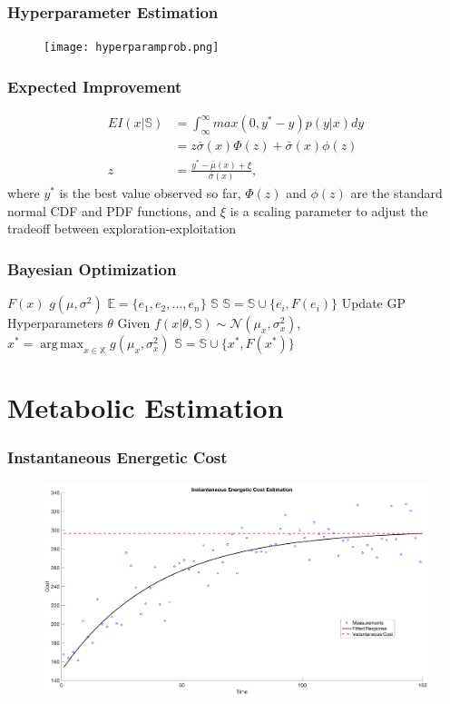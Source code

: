 \documentclass[compress, xcolor=pst]{beamer}
\DeclareMathOperator*{\argmax}{arg\,max}
\begin{document}
\begin{frame}
	\frametitle{\textbf{Hyperparameter Estimation}}
	\begin{figure}
	\centering
	\texttt{[image: hyperparamprob.png]}
	\end{figure}
\end{frame}

\begin{frame}
	\frametitle{\textbf{Expected Improvement}}
	\begin{align*}
	  EI(x\vert \mathbb{S}) &= \int_\infty^\infty max(0, y^*-y)p(y\vert x)dy\\
	    &= z\bar{\sigma}(x)\Phi(z) + \bar{\sigma}(x)\phi(z)\\
	  z &= \frac{y^* - \bar{\mu}(x) + \xi}{\bar{\sigma}(x)},
	\end{align*}
	where $y^*$ is the best value observed so far, $\Phi(z)$ and $\phi(z)$ are the standard normal CDF and PDF functions, and $\xi$ is a scaling parameter to adjust the tradeoff between exploration-exploitation
\end{frame}

\begin{frame}
	\frametitle{\textbf{Bayesian Optimization}}
	\begin{algorithmic}
	\State {} $F(x)$
	\State {} $g(\mu, \sigma^2)$
	\State {} $\mathbb{E} = \{e_1, e_2, ..., e_n\}$
	\State {} $\mathbb{S}$
	  \State $\mathbb{S} = \mathbb{S} \cup \{e_i, F(e_i)\}$
	\End
	  \State Update GP Hyperparameters $\theta$
	  \State Given $f(x\vert \theta, \mathbb{S}) \sim \mathcal{N}(\mu_x, \sigma_x^2)$,
	  \State $x^* = \argmax_{x \in \mathbb{X}} g(\mu_x, \sigma_x^2)$
	  \State $\mathbb{S} = \mathbb{S} \cup \{x^*, F(x^*)\}$
	\End
	\end{algorithmic}
\end{frame}

\section{Metabolic Estimation}
\begin{frame}
	\frametitle{\textbf{Instantaneous Energetic Cost}}
	\begin{figure}
	\centering
	\includegraphics[width=\textwidth]{metabolicestimation.png}
	\end{figure}
\end{frame}
\end{document}
